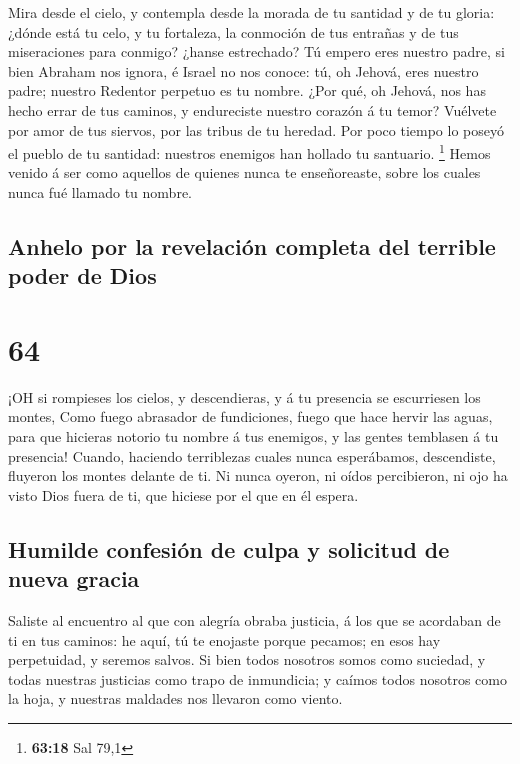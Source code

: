  Mira desde el cielo, y contempla desde la morada de tu
santidad y de tu gloria: ¿dónde está tu celo, y tu fortaleza, la
conmoción de tus entrañas y de tus miseraciones para conmigo? ¿hanse
estrechado?  Tú empero eres nuestro padre, si bien Abraham
nos ignora, é Israel no nos conoce: tú, oh Jehová, eres nuestro padre;
nuestro Redentor perpetuo es tu nombre.  ¿Por qué, oh
Jehová, nos has hecho errar de tus caminos, y endureciste nuestro
corazón á tu temor? Vuélvete por amor de tus siervos, por las tribus de
tu heredad.  Por poco tiempo lo poseyó el pueblo de tu
santidad: nuestros enemigos han hollado tu santuario. \footnote{\textbf{63:18}
  Sal 79,1}  Hemos venido á ser como aquellos de quienes
nunca te enseñoreaste, sobre los cuales nunca fué llamado tu nombre.

\hypertarget{anhelo-por-la-revelaciuxf3n-completa-del-terrible-poder-de-dios}{%
\subsection{Anhelo por la revelación completa del terrible poder de
Dios}\label{anhelo-por-la-revelaciuxf3n-completa-del-terrible-poder-de-dios}}

\hypertarget{section-63}{%
\section{64}\label{section-63}}

 ¡OH si rompieses los cielos, y descendieras, y á tu
presencia se escurriesen los montes,  Como fuego abrasador
de fundiciones, fuego que hace hervir las aguas, para que hicieras
notorio tu nombre á tus enemigos, y las gentes temblasen á tu presencia!
 Cuando, haciendo terriblezas cuales nunca esperábamos,
descendiste, fluyeron los montes delante de ti.  Ni nunca
oyeron, ni oídos percibieron, ni ojo ha visto Dios fuera de ti, que
hiciese por el que en él espera.

\hypertarget{humilde-confesiuxf3n-de-culpa-y-solicitud-de-nueva-gracia}{%
\subsection{Humilde confesión de culpa y solicitud de nueva
gracia}\label{humilde-confesiuxf3n-de-culpa-y-solicitud-de-nueva-gracia}}

 Saliste al encuentro al que con alegría obraba justicia, á
los que se acordaban de ti en tus caminos: he aquí, tú te enojaste
porque pecamos; en esos hay perpetuidad, y seremos salvos. 
Si bien todos nosotros somos como suciedad, y todas nuestras justicias
como trapo de inmundicia; y caímos todos nosotros como la hoja, y
nuestras maldades nos llevaron como viento.

